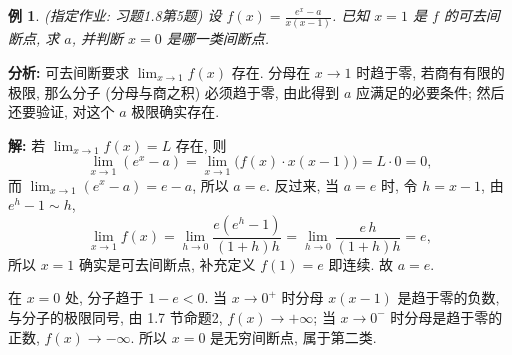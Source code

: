 \documentclass[UTF8,openany]{ctexbook}
\theoremstyle{chinesetextbook}
\newtheorem{example}{例}[section]
\newenvironment{cnsolution}{\par\indent\textbf{解:} \ignorespaces}{\par}
\begin{document}
\begin{example}
\textnormal{(指定作业: 习题1.8第5题)} 设 $\displaystyle f(x)=\frac{e^x-a}{x(x-1)}$. 已知 $x=1$ 是 $f$ 的可去间断点, 求 $a$, 并判断 $x=0$ 是哪一类间断点.
\end{example}
\par\indent\textbf{分析:} 可去间断要求 $\displaystyle\lim_{x\to1}f(x)$ 存在. 分母在 $x\to1$ 时趋于零, 若商有有限的极限, 那么分子 (分母与商之积) 必须趋于零, 由此得到 $a$ 应满足的必要条件; 然后还要验证, 对这个 $a$ 极限确实存在.
\begin{cnsolution}
若 $\displaystyle\lim_{x\to1}f(x)=L$ 存在, 则
\[
\lim_{x\to1}(e^x-a)=\lim_{x\to1}\bigl(f(x)\cdot x(x-1)\bigr)=L\cdot0=0,
\]
而 $\displaystyle\lim_{x\to1}(e^x-a)=e-a$, 所以 $a=e$. 反过来, 当 $a=e$ 时, 令 $h=x-1$, 由 $e^h-1\sim h$,
\[
\lim_{x\to1}f(x)=\lim_{h\to0}\frac{e(e^h-1)}{(1+h)h}=\lim_{h\to0}\frac{e\,h}{(1+h)h}=e,
\]
所以 $x=1$ 确实是可去间断点, 补充定义 $f(1)=e$ 即连续. 故 $a=e$.

在 $x=0$ 处, 分子趋于 $1-e<0$. 当 $x\to0^+$ 时分母 $x(x-1)$ 是趋于零的负数, 与分子的极限同号, 由 1.7 节命题2, $f(x)\to+\infty$; 当 $x\to0^-$ 时分母是趋于零的正数, $f(x)\to-\infty$. 所以 $x=0$ 是无穷间断点, 属于第二类.
\end{cnsolution}
\end{document}
